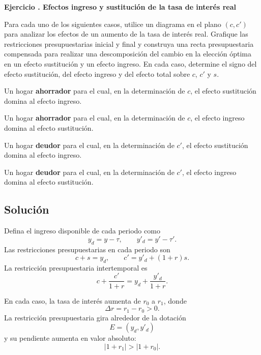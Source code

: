 \documentclass[11pt]{article}
\let\enumerateoriginal\enumerate
\let\endenumerateoriginal\endenumerate
\renewenvironment{enumerate}{%
  \enumerateoriginal
  \setlength{\itemsep}{0.5em}%
  \setlength{\parsep}{0pt}%
  \setlength{\topsep}{0.4em}%
}{\endenumerateoriginal}
\newcounter{problema}
\newenvironment{problema}[1]{%
  \par
  \refstepcounter{problema}%
  \addvspace{0.9em}%
  \noindent\textbf{Ejercicio \theproblema. #1}
  \par\nobreak\smallskip
}{\par}
\begin{document}
\begin{problema}{Efectos ingreso y sustitución de la tasa de interés real}

Para cada uno de los siguientes casos, utilice un diagrama en el plano $(c,c')$ para analizar los efectos de un aumento de la tasa de interés real. Grafique las restricciones presupuestarias inicial y final y construya una recta presupuestaria compensada para realizar una descomposición del cambio en la elección óptima en un efecto sustitución y un efecto ingreso. En cada caso, determine el signo del efecto sustitución, del efecto ingreso y del efecto total sobre $c$, $c'$ y $s$.

\begin{enumerate}
    \item Un hogar \textbf{ahorrador} para el cual, en la determinación de $c$, el efecto sustitución domina al efecto ingreso.

    \item Un hogar \textbf{ahorrador} para el cual, en la determinación de $c$, el efecto ingreso domina al efecto sustitución.

    \item Un hogar \textbf{deudor} para el cual, en la determinación de $c'$, el efecto sustitución domina al efecto ingreso.

    \item Un hogar \textbf{deudor} para el cual, en la determinación de $c'$, el efecto ingreso domina al efecto sustitución.
\end{enumerate}

\end{problema}








\subsection*{Solución}

Defina el ingreso disponible de cada periodo como
\[
  y_d=y-\tau,
  \qquad
  y'_d=y'-\tau'.
\]
Las restricciones presupuestarias en cada periodo son
\[
  c+s=y_d, 
\qquad
  c'=y'_d+(1+r)s.
\]
La restricción presupuestaria intertemporal es
\[
  c+\frac{c'}{1+r}
  =
  y_d+\frac{y'_d}{1+r}.
\]

En cada caso, la tasa de interés aumenta de \(r_0\) a \(r_1\), donde
\[
  \Delta r=r_1-r_0>0.
\]
La restricción presupuestaria gira alrededor de la dotación
\[
  E=(y_d,y'_d)
\]
y su pendiente aumenta en valor absoluto:
\[
  |1+r_1| > |1+r_0|.
\]
\end{document}
